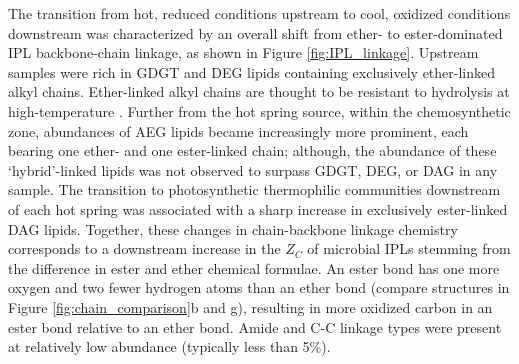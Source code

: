 The transition from hot, reduced conditions upstream to cool, oxidized conditions downstream was characterized by an overall shift from ether- to ester-dominated IPL backbone-chain linkage, as shown in Figure \ref{fig:IPL_linkage}. Upstream samples were rich in GDGT and DEG lipids containing exclusively ether-linked alkyl chains. Ether-linked alkyl chains are thought to be resistant to hydrolysis at high-temperature \citep{daniel2000biomolecular}. Further from the hot spring source, within the chemosynthetic zone, abundances of AEG lipids became increasingly more prominent, each bearing one ether- and one ester-linked chain; although, the abundance of these `hybrid'-linked lipids was not observed to surpass GDGT, DEG, or DAG in any sample. The transition to photosynthetic thermophilic communities downstream of each hot spring was associated with a sharp increase in exclusively ester-linked DAG lipids. Together, these changes in chain-backbone linkage chemistry corresponds to a downstream increase in the $Z_{C}$ of microbial IPLs stemming from the difference in ester and ether chemical formulae. An ester bond has one more oxygen and two fewer hydrogen atoms than an ether bond (compare structures in Figure \ref{fig:chain_comparison}b and g), resulting in more oxidized carbon in an ester bond relative to an ether bond. Amide and C-C linkage types were present at relatively low abundance (typically less than 5\%).





